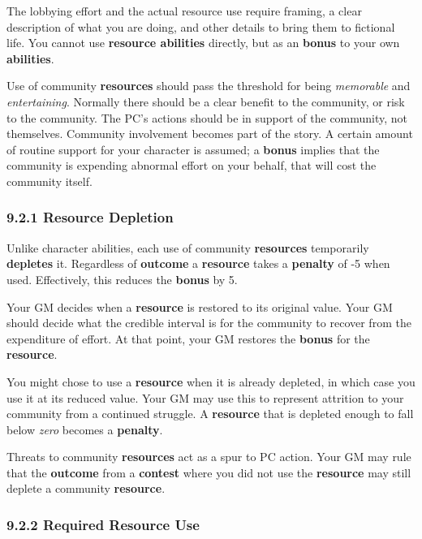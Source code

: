 \documentclass[
  11pt,
]{article}
\begin{document}
The lobbying effort and the actual resource use require framing, a clear
description of what you are doing, and other details to bring them to
fictional life. You cannot use \textbf{resource abilities} directly, but
as an \textbf{bonus} to your own \textbf{abilities}.

Use of community \textbf{resources} should pass the threshold for being
\emph{memorable} and \emph{entertaining}. Normally there should be a
clear benefit to the community, or risk to the community. The PC's
actions should be in support of the community, not themselves. Community
involvement becomes part of the story. A certain amount of routine
support for your character is assumed; a \textbf{bonus} implies that the
community is expending abnormal effort on your behalf, that will cost
the community itself.

\hypertarget{resource-depletion}{%
\subsubsection{9.2.1 Resource Depletion}\label{resource-depletion}}

Unlike character abilities, each use of community \textbf{resources}
temporarily \textbf{depletes} it. Regardless of \textbf{outcome} a
\textbf{resource} takes a \textbf{penalty} of -5 when used. Effectively,
this reduces the \textbf{bonus} by 5.

Your GM decides when a \textbf{resource} is restored to its original
value. Your GM should decide what the credible interval is for the
community to recover from the expenditure of effort. At that point, your
GM restores the \textbf{bonus} for the \textbf{resource}.

You might chose to use a \textbf{resource} when it is already depleted,
in which case you use it at its reduced value. Your GM may use this to
represent attrition to your community from a continued struggle. A
\textbf{resource} that is depleted enough to fall below \emph{zero}
becomes a \textbf{penalty}.

Threats to community \textbf{resources} act as a spur to PC action. Your
GM may rule that the \textbf{outcome} from a \textbf{contest} where you
did not use the \textbf{resource} may still deplete a community
\textbf{resource}.

\hypertarget{required-resource-use}{%
\subsubsection{9.2.2 Required Resource
Use}\label{required-resource-use}}
\end{document}
